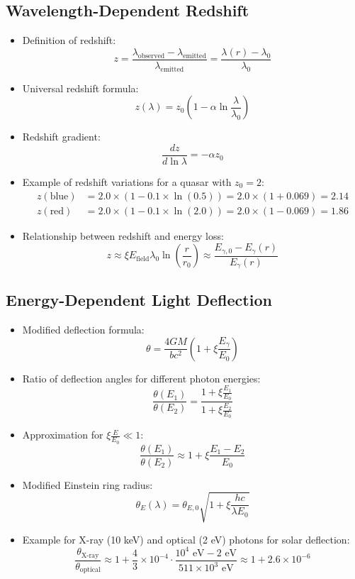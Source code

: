 \documentclass[12pt,a4paper]{article}
\begin{document}
	\subsection{Wavelength-Dependent Redshift}
	\begin{itemize}
		\item Definition of redshift:
		$$z = \frac{\lambda_{\text{observed}} - \lambda_{\text{emitted}}}{\lambda_{\text{emitted}}} = \frac{\lambda(r) - \lambda_0}{\lambda_0}$$
		
		\item Universal redshift formula:
		$$\boxed{z(\lambda) = z_0\left(1 - \alpha \ln\frac{\lambda}{\lambda_0}\right)}$$
		
		\item Redshift gradient:
		$$\frac{dz}{d\ln\lambda} = -\alpha z_0$$
		
		\item Example of redshift variations for a quasar with $z_0 = 2$:
		\begin{align*}
			z(\text{blue}) &= 2.0 \times (1 - 0.1 \times \ln(0.5)) = 2.0 \times (1 + 0.069) = 2.14\\
			z(\text{red}) &= 2.0 \times (1 - 0.1 \times \ln(2.0)) = 2.0 \times (1 - 0.069) = 1.86
		\end{align*}
		
		\item Relationship between redshift and energy loss:
		$$z \approx \xi E_{\text{field}} \lambda_0 \ln\left(\frac{r}{r_0}\right) \approx \frac{E_{\gamma,0} - E_\gamma(r)}{E_\gamma(r)}$$
	\end{itemize}
	
	\subsection{Energy-Dependent Light Deflection}
	\begin{itemize}
		\item Modified deflection formula:
		$$\boxed{\theta = \frac{4GM}{bc^2}\left(1 + \xi \frac{E_\gamma}{E_0}\right)}$$
		
		\item Ratio of deflection angles for different photon energies:
		$$\frac{\theta(E_1)}{\theta(E_2)} = \frac{1 + \xi \frac{E_1}{E_0}}{1 + \xi \frac{E_2}{E_0}}$$
		
		\item Approximation for $\xi \frac{E}{E_0} \ll 1$:
		$$\frac{\theta(E_1)}{\theta(E_2)} \approx 1 + \xi \frac{E_1 - E_2}{E_0}$$
		
		\item Modified Einstein ring radius:
		$$\theta_E(\lambda) = \theta_{E,0} \sqrt{1 + \xi \frac{hc}{\lambda E_0}}$$
		
		\item Example for X-ray (10 keV) and optical (2 eV) photons for solar deflection:
		$$\frac{\theta_{\text{X-ray}}}{\theta_{\text{optical}}} \approx 1 + \frac{4}{3} \times 10^{-4} \cdot \frac{10^4 \text{ eV} - 2 \text{ eV}}{511 \times 10^3 \text{ eV}} \approx 1 + 2.6 \times 10^{-6}$$
	\end{itemize}
	
\end{document}
